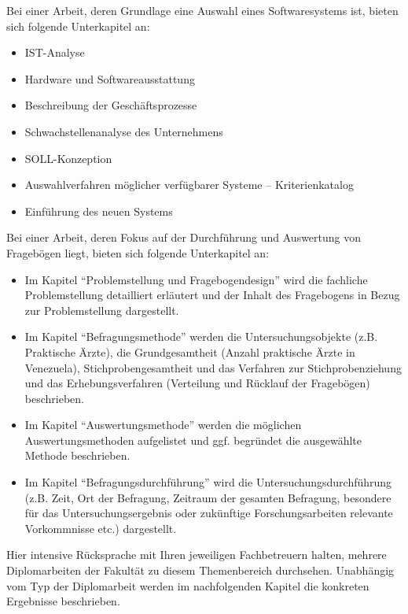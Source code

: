 Bei einer Arbeit, deren Grundlage eine Auswahl eines Softwaresystems ist, bieten sich folgende Unterkapitel an:
\begin{itemize}
	\item IST-Analyse
	\item Hardware und Softwareausstattung
	\item Beschreibung der Geschäftsprozesse
	\item Schwachstellenanalyse des Unternehmens
	\item SOLL-Konzeption
	\item Auswahlverfahren möglicher verfügbarer Systeme -- Kriterienkatalog
	\item Einführung des neuen Systems
\end{itemize}

Bei einer Arbeit, deren Fokus auf der Durchführung und Auswertung von Fragebögen liegt, bieten sich folgende Unterkapitel an:
\begin{itemize}
	\item Im Kapitel \enquote{Problemstellung und Fragebogendesign} wird die fachliche Problemstellung detailliert erläutert und der Inhalt des Fragebogens in Bezug zur Problemstellung dargestellt.
	\item Im Kapitel \enquote{Befragungsmethode} werden die Untersuchungsobjekte (z.B. Praktische Ärzte), die Grundgesamtheit (Anzahl praktische Ärzte in Venezuela), Stichprobengesamtheit und das Verfahren zur Stichprobenziehung und das Erhebungsverfahren (Verteilung und Rücklauf der Fragebögen) beschrieben.
	\item Im Kapitel \enquote{Auswertungsmethode} werden die möglichen Auswertungsmethoden aufgelistet und ggf. begründet die ausgewählte Methode beschrieben.
	\item Im Kapitel \enquote{Befragungsdurchführung} wird die Untersuchungsdurchführung (z.B. Zeit, Ort der Befragung, Zeitraum der gesamten Befragung, besondere für das Untersuchungsergebnis oder zukünftige Forschungsarbeiten relevante Vorkommnisse etc.) dargestellt.
\end{itemize}

Hier intensive Rücksprache mit Ihren jeweiligen Fachbetreuern halten, mehrere Diplomarbeiten der Fakultät zu diesem Themenbereich durchsehen. Unabhängig vom Typ der Diplomarbeit werden im nachfolgenden Kapitel die konkreten Ergebnisse beschrieben.
\fi\makeatother